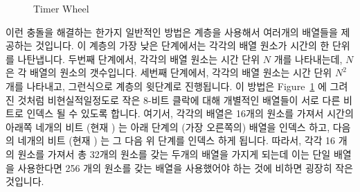 \begin{figure}[tb]
\centering
{}
\caption{Timer Wheel}
\label{fig:advsync:Timer Wheel}
\end{figure}

이런 충돌을 해결하는 한가지 일반적인 방법은 계층을 사용해서 여러개의 배열들을
제공하는 것입니다.
이 계층의 가장 낮은 단계에서는 각각의 배열 원소가 시간의 한 단위를 나탄냅니다.
두번째 단계에서, 각각의 배열 원소는 시간 단위 $N$ 개를 나타내는데, $N$ 은 각
배열의 원소의 갯수입니다.
세번째 단계에서, 각각의 배열 원소는 시간 단위 $N^2$ 개를 나타내고, 그런식으로
계층의 윗단계로 진행됩니다.
이 방법은
Figure~\ref{fig:advsync:Timer Wheel}
에 그려진 것처럼 비현실적일정도로 작은 8-비트 클락에 대해 개별적인 배열들이
서로 다른 비트로 인덱스 될 수 있도록 합니다.
여기서, 각각의 배열은 16개의 원소를 가져서 시간의 아래쪽 네개의 비트 (현재
) 는 아래 단계의 (가장 오른쪽의) 배열을 인덱스 하고, 다음의 네개의 비트
(현재 ) 는 그 다음 위 단계를 인덱스 하게 됩니다.
따라서, 각각 16 개의 원소를 가져서 총 32개의 원소를 갖는 두개의 배열을 가지게
되는데 이는 단일 배열을 사용한다면 256 개의 원소를 갖는 배열을 사용했어야 하는
것에 비하면 굉장히 작은 것입니다.

